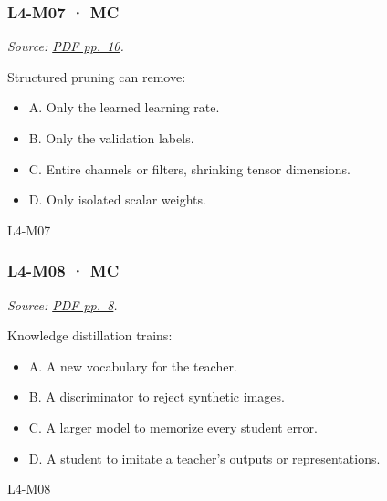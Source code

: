 \noindent\begin{minipage}{\linewidth}

\subsubsection{L4-M07 · MC}\label{l4-m07-mc}

\emph{Source:
\href{../Lab\%20Sessions/Lab4/manolo_presentation.pdf\#page=10}{PDF
pp.~10}.}

Structured pruning can remove:

\begin{itemize}
\tightlist
\item
  A. Only the learned learning rate.
\item
  B. Only the validation labels.
\item
  C. Entire channels or filters, shrinking tensor dimensions.
\item
  D. Only isolated scalar weights.
\end{itemize}

\begin{solution}[8mm]{L4-M07}

\end{solution}
\end{minipage}\par\medskip

\noindent\begin{minipage}{\linewidth}

\subsubsection{L4-M08 · MC}\label{l4-m08-mc}

\emph{Source:
\href{../Lab\%20Sessions/Lab4/manolo_presentation.pdf\#page=8}{PDF
pp.~8}.}

Knowledge distillation trains:

\begin{itemize}
\tightlist
\item
  A. A new vocabulary for the teacher.
\item
  B. A discriminator to reject synthetic images.
\item
  C. A larger model to memorize every student error.
\item
  D. A student to imitate a teacher's outputs or representations.
\end{itemize}

\begin{solution}[8mm]{L4-M08}

\end{solution}
\end{minipage}\par\medskip

